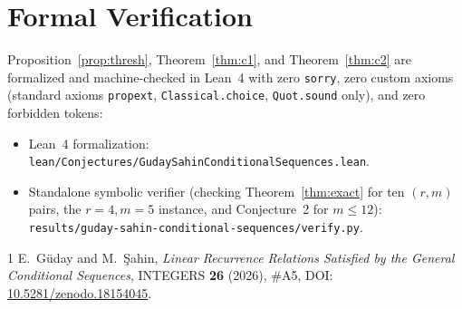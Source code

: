 \documentclass[11pt]{article}
\theoremstyle{remark}
\begin{document}
\section{Formal Verification}

Proposition~\ref{prop:thresh}, Theorem~\ref{thm:c1}, and Theorem~\ref{thm:c2} are formalized and machine-checked in Lean~4 with zero \texttt{sorry}, zero custom axioms (standard axioms \texttt{propext}, \texttt{Classical.choice}, \texttt{Quot.sound} only), and zero forbidden tokens:
\begin{itemize}
\item Lean~4 formalization: \texttt{lean/Conjectures/GudaySahinConditionalSequences.lean}.
\item Standalone symbolic verifier (checking Theorem~\ref{thm:exact} for ten $(r, m)$ pairs, the $r=4, m=5$ instance, and Conjecture~2 for $m \le 12$):\\
\texttt{results/guday-sahin-conditional-sequences/verify.py}.
\end{itemize}

\begin{thebibliography}{1}
E.~G\"uday and M.~\c{S}ahin,
\emph{Linear Recurrence Relations Satisfied by the General Conditional Sequences},
INTEGERS \textbf{26} (2026), \#A5,
DOI: \href{https://doi.org/10.5281/zenodo.18154045}{10.5281/zenodo.18154045}.
\end{thebibliography}
\end{document}
